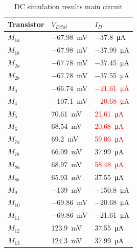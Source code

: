 \begin{table}[H]
    \centering
    \caption{DC simulation results main circuit}
    \begin{tabularx}{\textwidth}{>{\centering\arraybackslash}X >{\centering\arraybackslash}X >{\centering\arraybackslash}X}
        \toprule
        \textbf{Transistor} & \textbf{$V_{DSat}$} & \textbf{$I_D$}\\
        \midrule
        $M_{1a}$ & \SI{-67.98}{\milli\volt} & \SI{-37.8}{\micro\ampere}\\
        \midrule
        $M_{1b}$ & \SI{-67.98}{\milli\volt} & \SI{-37.99}{\micro\ampere}\\
        \midrule
        $M_{2a}$ & \SI{-67.78}{\milli\volt} & \SI{-37.45}{\micro\ampere}\\
        \midrule
        $M_{2b}$ & \SI{-67.78}{\milli\volt} & \SI{-37.55}{\micro\ampere}\\
        \midrule
        $M_{3}$ & \SI{-66.74}{\milli\volt} & \textcolor{red}{\SI{-21.61}{\micro\ampere}}\\
        \midrule
        $M_{4}$ & \SI{-107.1}{\milli\volt} & \textcolor{red}{\SI{-20.68}{\micro\ampere}}\\
        \midrule
        $M_{5}$ & \SI{70.61}{\milli\volt} & \textcolor{red}{\SI{21.61}{\micro\ampere}}\\
        \midrule
        $M_{6}$ & \SI{68.54}{\milli\volt} & \textcolor{red}{\SI{20.68}{\micro\ampere}}\\
        \midrule
        $M_{7a}$ & \SI{69.2}{\milli\volt} & \textcolor{red}{\SI{59.06}{\micro\ampere}}\\
        \midrule
        $M_{7b}$ & \SI{66.09}{\milli\volt} & \SI{37.99}{\micro\ampere}\\
        \midrule
        $M_{8a}$ & \SI{68.97}{\milli\volt} & \textcolor{red}{\SI{58.48}{\micro\ampere}}\\
        \midrule
        $M_{8b}$ & \SI{65.93}{\milli\volt} & \SI{37.55}{\micro\ampere}\\
        \midrule
        $M_{9}$ & \SI{-139}{\milli\volt} & \SI{-150.8}{\micro\ampere}\\
        \midrule
        $M_{10}$ & \SI{-69.86}{\milli\volt} & \SI{-20.68}{\micro\ampere}\\
        \midrule
        $M_{11}$ & \SI{-69.86}{\milli\volt} & \SI{-21.61}{\micro\ampere}\\
        \midrule
        $M_{12}$ & \SI{123.9}{\milli\volt} & \SI{37.55}{\micro\ampere}\\
        \midrule
        $M_{13}$ & \SI{124.3}{\milli\volt} & \SI{37.99}{\micro\ampere}\\
        \bottomrule
    \end{tabularx}
    \label{tab:DC-RFC} 
\end{table}


